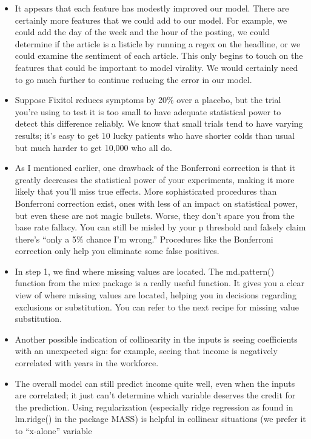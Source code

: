 \documentclass[]{book}
\begin{document}
\begin{itemize}
\item
  It appears that each feature has modestly improved our model. There
  are certainly more features that we could add to our model. For
  example, we could add the day of the week and the hour of the posting,
  we could determine if the article is a listicle by running a regex on
  the headline, or we could examine the sentiment of each article. This
  only begins to touch on the features that could be important to model
  virality. We would certainly need to go much further to continue
  reducing the error in our model.
\item
  Suppose Fixitol reduces symptoms by 20\% over a placebo, but the trial
  you're using to test it is too small to have adequate statistical
  power to detect this difference reliably. We know that small trials
  tend to have varying results; it's easy to get 10 lucky patients who
  have shorter colds than usual but much harder to get 10,000 who all
  do.
\item
  As I mentioned earlier, one drawback of the Bonferroni correction is
  that it greatly decreases the statistical power of your experiments,
  making it more likely that you'll miss true effects. More
  sophisticated procedures than Bonferroni correction exist, ones with
  less of an impact on statistical power, but even these are not magic
  bullets. Worse, they don't spare you from the base rate fallacy. You
  can still be misled by your p threshold and falsely claim there's
  ``only a 5\% chance I'm wrong.'' Procedures like the Bonferroni
  correction only help you eliminate some false positives.
\item
  In step 1, we find where missing values are located. The md.pattern()
  function from the mice package is a really useful function. It gives
  you a clear view of where missing values are located, helping you in
  decisions regarding exclusions or substitution. You can refer to the
  next recipe for missing value substitution.
\item
  Another possible indication of collinearity in the inputs is seeing
  coefficients with an unexpected sign: for example, seeing that income
  is negatively correlated with years in the workforce.
\item
  The overall model can still predict income quite well, even when the
  inputs are correlated; it just can't determine which variable deserves
  the credit for the prediction. Using regularization (especially ridge
  regression as found in lm.ridge() in the package MASS) is helpful in
  collinear situations (we prefer it to ``x-alone'' variable

\end{itemize}
\end{document}
